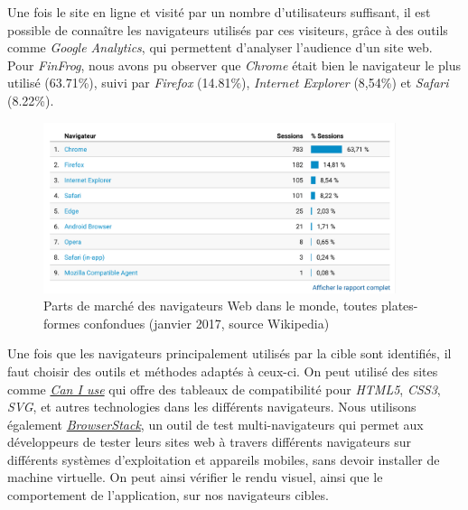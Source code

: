 \documentclass[12pt,a4paper]{article}
\begin{document}
  \bigskip

  Une fois le site en ligne et visité par un nombre d'utilisateurs
  suffisant, il est possible de connaître les navigateurs utilisés par ces
  visiteurs, grâce à des outils comme \emph{Google Analytics}, qui
  permettent d'analyser l'audience d'un site web. Pour \emph{FinFrog},
  nous avons pu observer que \emph{Chrome} était bien le navigateur le
  plus utilisé (63.71\%), suivi par \emph{Firefox} (14.81\%),
  \emph{Internet Explorer} (8,54\%) et \emph{Safari} (8.22\%).

  \begin{figure}[h]
    \centering
    \includegraphics[height=5cm]{figures/FF-browsers.png}
    \caption{Parts de marché des navigateurs Web dans le monde, toutes plates-formes confondues (janvier 2017, source Wikipedia)}
  \end{figure}

  \bigskip

  Une fois que les navigateurs principalement utilisés par la cible sont
  identifiés, il faut choisir des outils et méthodes adaptés à ceux-ci. On
  peut utilisé des sites comme \href{http://caniuse.com/}{\emph{Can I
  use}} qui offre des tableaux de compatibilité pour \emph{HTML5},
  \emph{CSS3}, \emph{SVG}, et autres technologies dans les différents
  navigateurs. Nous utilisons également
  \href{https://www.browserstack.com/}{\emph{BrowserStack}}, un outil de
  test multi-navigateurs qui permet aux développeurs de tester leurs sites
  web à travers différents navigateurs sur différents systèmes
  d'exploitation et appareils mobiles, sans devoir installer de machine
  virtuelle. On peut ainsi vérifier le rendu visuel, ainsi que le
  comportement de l'application, sur nos navigateurs cibles.

  \bigskip
\end{document}
